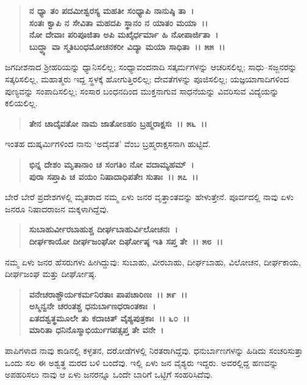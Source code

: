 \begin{verse}
\textbf{ನ ಧ್ಯಾ ತಂ ಪದಮೀಶ್ವರಸ್ಯ ಮಹತೀ ಸಂಧ್ಯಾಪಿ ನಾನುಷ್ಠಿ ತಾ~।}\\\textbf{ಸಂತಃ ಕ್ವಾಪಿ ನ ಸೇವಿತಾ ಮಹದಪಿ ಸ್ಥಾನಂ ನ ಯಾತಂ ಮಯಾ~।। }\\\textbf{ನೋ ದೇವಾಃ ಪರಿಪೂಜಿತಾ ಅಪಿ ಮಖೈರ್ಧರ್ಮಾ ಹಿ ನೋಪಾರ್ಜಿತಾ~।}\\\textbf{ಬುದ್ಧ್ಯಾ ವಾ ಸ್ಮತಿಬಂಧಮೋಚನಕರೀ ವಿದ್ಯಾ ಮಯಾ ಸಾಧಿತಾ~।। ೫೫~।।}
\end{verse}

ಜಗದೀಶನಾದ ಶ‍್ರೀಹರಿಯನ್ನು ಧ್ಯಾನಿಸಲಿಲ್ಲ; ಸಂಧ್ಯಾವಂದನಾದಿ ಸತ್ಕರ್ಮಗಳನ್ನು ಆಚರಿಸಲಿಲ್ಲ; ಸಾಧು–ಸಜ್ಜನರನ್ನು ಸತ್ಕರಿಸಲಿಲ್ಲ, ಮಹಾತ್ಮರು ಇದ್ದ ಸ್ಥಳಕ್ಕೆ ಹೋಗುತ್ತಿರಲಿಲ್ಲ; ದೇವತೆಗಳನ್ನು ಪೂಜಿಸಲಿಲ್ಲ; ಯಜ್ಞಯಾಗಾದಿಗಳಿಂದ ಪುಣ್ಯವನ್ನು ಸಂಪಾದಿಸಲಿಲ್ಲ; ಸಂಸಾರ ಬಂಧನದಿಂದ ಮುಕ್ತನಾಗುವ ಸಾಧನೆಯನ್ನು ವಿವರಿಸುವ ವಿದ್ಯೆಯನ್ನು ಕಲಿಯಲಿಲ್ಲ.

\begin{verse}
\textbf{ತೇನ ಚಾದೈವತೋ ನಾಮ ಜಾತೋಽಹಂ ಬ್ರಹ್ಮರಾಕ್ಷಸಃ~।। ೫೬~।।}
\end{verse}

ಇಂತಹ ದುಷ್ಕರ್ಮಿಗಳಿಂದ ನಾನು `ಅದೈವತ' ವೆಂಬ ಬ್ರಹ್ಮರಾಕ್ಷಸನಾಗಿ ಹುಟ್ಟಿದೆ.

\begin{verse}
\textbf{ಭಿನ್ನ ದೇಶಂ ಮೃತಾನಾಂ ಚ ಸಂಗತಿಂ ನೋ ವದಾಮ್ಯಹಮ್~।}\\\textbf{ಪುರಾ ಸಪ್ತಾಪಿ ಚ ವಯಂ ನಿಷಾದಾಧಿಪತೇಃ ಸುತಾಃ~।। ೫೭~।।}
\end{verse}

ಬೇರೆ ಬೇರೆ ಪ್ರದೇಶಗಳಲ್ಲಿ ಮೃತರಾದ ನಮ್ಮ ಏಳು ಜನರ ವೃತ್ತಾಂತವನ್ನು ಹೇಳುತ್ತೇನೆ. ಪೂರ್ವದಲ್ಲಿ ನಾವು ಏಳು ಜನರೂ ನಿಷಾದರಾಜನ ಮಕ್ಕಳಾಗಿದ್ದೆವು.

\begin{verse}
\textbf{ಸುಬಾಹುರ್ವೀರಬಾಹುಶ್ಚ ದೀರ್ಘಬಾಹುರ್ವಿಲೋಚನಃ~।}\\\textbf{ದೀರ್ಘಕಾಯೋ ದೀರ್ಘಜಂಘೋ ದಿರ್ಘೋಷ್ಠ ಇತಿ ಸಪ್ತ ತೇ~।। ೫೮~।।}
\end{verse}

ನಮ್ಮ ಏಳು ಜನರ ಹೆಸರುಗಳು ಹೀಗಿದ್ದುವು: ಸುಬಾಹು, ವೀರಬಾಹು, ದೀರ್ಘಬಾಹು, ವಿಲೋಚನ, ದೀರ್ಘಕಾಯ, ದೀರ್ಘಜಂಘ ಮತ್ತು ದೀರ್ಘೋಷ್ಠ.

\begin{verse}
\textbf{ವನೇಚರಾಶ್ಚೌರ್ಯಕರ್ಮನಿರತಾಃ ಪಾಪಚಾರಿಣಃ~।। ೫೯~।।}\\\textbf{ಅಸ್ಮಿನ್ವನೇ ಚರಂತಶ್ಚ ಧನುರ್ಬಾಣಧರಾಂತಕಾಃ~। }\\\textbf{ಏತದಶ್ವತ್ಥಮೂಲೇ ತು ಕದಾಚಿತ್ ವೈಶ್ಯಪುತ್ರಕಾಃ~।। ೬೦~।।} \\\textbf{ಮಾರಿತಾ ಧನಿನೊಸ್ಮಾಭಿರ್ಯುಗಪತ್ಸಪ್ತ ತೇ ವನೇ~।}
\end{verse}

ಪಾಪಿಗಳಾದ ನಾವು ಕಾಡಿನಲ್ಲಿ ಕಳ್ಳತನ, ದರೋಡೆಗಳಲ್ಲಿ ನಿರತರಾಗಿದ್ದೆವು. ಧನುರ್ಬಾಣಗಳನ್ನು ಹಿಡಿದು ಸಂಚರಿಸುತ್ತಾ ಒಂದು ಸಲ ಈ ಅಶ್ವತ್ಥ ಮರದ ಬಳಿ ಬಂದೆವು. ಇಲ್ಲಿ ಏಳು ಜನ ವೈಶ್ಯರು ಇದ್ದರು. ಅವರಲ್ಲಿದ್ದ ಹಣವನ್ನು ಅಪಹರಿಸಲು ನಾವು ಆ ಏಳು ಜನರನ್ನೂ ಒಂದೇ ಬಾರಿಗೆ ಒಟ್ಟಿಗೆ ಸಂಹರಿಸಿದೆವು.

